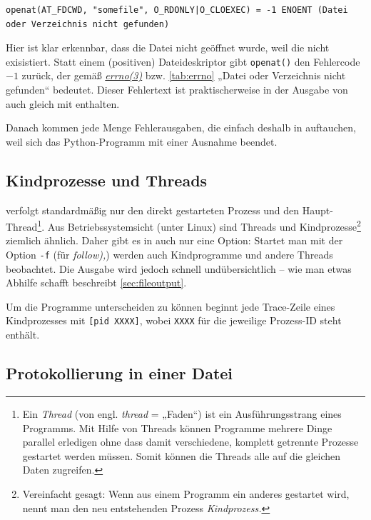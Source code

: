 \begin{lstlisting}
openat(AT_FDCWD, "somefile", O_RDONLY|O_CLOEXEC) = -1 ENOENT (Datei oder Verzeichnis nicht gefunden)
\end{lstlisting}

Hier ist klar erkennbar, dass die Datei nicht geöffnet wurde, weil die nicht exisistiert. Statt
einem (positiven) Dateideskriptor gibt \texttt{openat()} den Fehlercode $-1$ zurück, der gemäß
\href{http://man7.org/linux/man-pages/man3/errno.3.html}{\emph{errno(3)}} bzw. \autoref{tab:errno} 
„Datei oder Verzeichnis nicht gefunden“ bedeutet. Dieser Fehlertext ist praktischerweise in der
Ausgabe von \strace{} auch gleich mit enthalten.

Danach kommen jede Menge Fehlerausgaben, die einfach deshalb in \strace{} auftauchen, weil sich das
Python-Programm mit einer Ausnahme beendet.

\subsection{Kindprozesse und Threads}

\strace{} verfolgt standardmäßig nur den direkt gestarteten Prozess und den
Haupt-Thread\footnote{Ein \emph{Thread} (von engl. \emph{thread} = „Faden“) ist ein
Ausführungsstrang eines Programms. Mit Hilfe von Threads können Programme mehrere Dinge parallel
erledigen ohne dass damit verschiedene, komplett getrennte Prozesse gestartet werden müssen. Somit
können die Threads alle auf die gleichen Daten zugreifen.}. Aus Betriebssystemsicht (unter Linux)
sind Threads und Kindprozesse\footnote{Vereinfacht gesagt: Wenn aus einem Programm ein anderes
gestartet wird, nennt man den neu entstehenden Prozess \emph{Kindprozess.}} ziemlich ähnlich. Daher
gibt es in \strace{} auch nur eine Option: Startet man \strace{} mit der Option \texttt{-f} (für
\emph{follow),}) werden auch Kindprogramme und andere Threads beobachtet. Die Ausgabe wird jedoch
schnell undübersichtlich -- wie man etwas Abhilfe schafft beschreibt \autoref{sec:fileoutput}.

Um die Programme unterscheiden zu können beginnt jede Trace-Zeile eines Kindprozesses mit
\texttt{[pid XXXX]}, wobei \texttt{XXXX} für die jeweilige Prozess-ID steht enthält.


\subsection{Protokollierung in einer Datei}
\label{sec:fileoutput}

